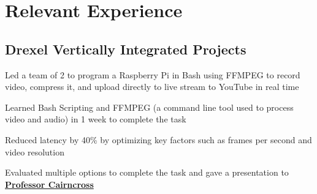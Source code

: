 \documentclass[]{deedy-resume-openfont}
\begin{document}
\begin{minipage}[t]{0.66\textwidth}


    \section{Relevant Experience}

    \subsection{Drexel Vertically Integrated Projects}
    \vspace{\topsep} %
    \begin{tightemize}
        \item Led a team of 2 to program a Raspberry Pi in Bash using FFMPEG to record video, compress it, and upload directly to live stream to YouTube in real time
        \item Learned Bash Scripting and FFMPEG (a command line tool used to process video and audio) in 1 week to complete the task
        \item Reduced latency by 40\% by optimizing key factors such as frames per second and video resolution
        \item Evaluated multiple options to complete the task and gave a presentation to \textbf{\href{https://drexel.edu/engineering/about/faculty-staff/C/cairncross-richard/}{Professor Cairncross}}
    \end{tightemize}
    \sectionsep



\end{minipage}
\end{document}

